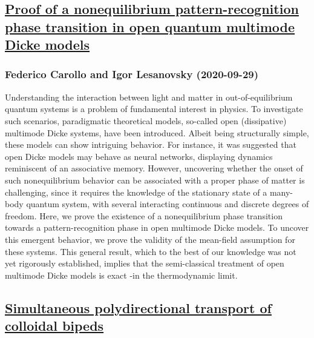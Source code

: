 \subsection*{\href{http://arxiv.org/abs/2009.13932v1}{Proof of a nonequilibrium pattern-recognition phase transition in open  quantum multimode Dicke models}}
\subsubsection*{Federico Carollo and Igor Lesanovsky (2020-09-29)}
Understanding the interaction between light and matter in out-of-equilibrium
quantum systems is a problem of fundamental interest in physics. To investigate
such scenarios, paradigmatic theoretical models, so-called open (dissipative)
multimode Dicke systems, have been introduced. Albeit being structurally
simple, these models can show intriguing behavior. For instance, it was
suggested that open Dicke models may behave as neural networks, displaying
dynamics reminiscent of an associative memory. However, uncovering whether the
onset of such nonequilibrium behavior can be associated with a proper phase of
matter is challenging, since it requires the knowledge of the stationary state
of a many-body quantum system, with several interacting continuous and discrete
degrees of freedom. Here, we prove the existence of a nonequilibrium phase
transition towards a pattern-recognition phase in open multimode Dicke models.
To uncover this emergent behavior, we prove the validity of the mean-field
assumption for these systems. This general result, which to the best of our
knowledge was not yet rigorously established, implies that the semi-classical
treatment of open multimode Dicke models is exact -in the thermodynamic limit.

\subsection*{\href{http://arxiv.org/abs/2009.13930v1}{Simultaneous polydirectional transport of colloidal bipeds}}
